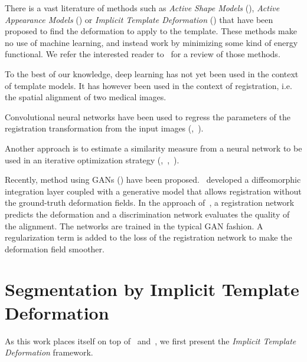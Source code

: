 There is a vast literature of methods such as \textit{Active Shape Models} (\textcite{cootes1995}), \textit{Active Appearance Models} (\textcite{cootes1998ECCV}) or \textit{Implicit Template Deformation} (\textcite{saddi2007}) that have been proposed to find the deformation to apply to the template. These methods make no use of machine learning, and instead work by minimizing some kind of energy functional. 
We refer the interested reader to~\textcite{heimann2009} for a review of those methods.

To the best of our knowledge, deep learning has not yet been used in the context of template models. It has however been used in the context of registration, i.e. the spatial alignment of two medical images.

Convolutional neural networks have been used to regress the parameters of the registration transformation from the input images (\textcite{miao2016},~\textcite{yang2016}).

Another approach is to estimate a similarity measure from a neural network to be used in an iterative optimization strategy (\textcite{wu2013MICCAI},~\textcite{cheng2015},~\textcite{simonovosky2016MICCAI}).

Recently, method using GANs (\textcite{goodfellow2014}) have been proposed.~\textcite{dalca2018MICCAI} developed a diffeomorphic integration layer coupled with a generative model that allows registration without the ground-truth deformation fields. In the approach of~\textcite{fan2018MICCAI}, a registration network predicts the deformation and a discrimination network evaluates the quality of the alignment. The networks are trained in the typical GAN fashion. A regularization term is added to the loss of the registration network to make the deformation field smoother.

\section{Segmentation by Implicit Template Deformation}
\label{sec:implicit}

As this work places itself on top of~\textcite{mory2012MICCAI} and~\textcite{prevost2013PHD}, we first present the \textit{Implicit Template Deformation} framework. 

